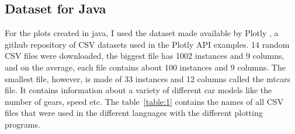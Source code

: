 \documentclass[12pt, a4paper,oneside]{report}
\begin{document}
\subsection{Dataset for Java}
For the plots created in java, I used the dataset made available by Plotly \cite{plotly}, a github repository of CSV datasets used in the Plotly API examples. 14 random CSV files were downloaded, the biggest file has 1002 instances and 9 columns, and on the average, each file contains about 100 instances and 9 columns. The smallest file, however, is made of 33 instances and 12 columns called the mtcars file. It contains information about a variety of different car models like the number of gears, speed etc. The table~\ref{table:1} contains the names of all CSV files that were used in the different languages with the different plotting programs.
\end{document}

